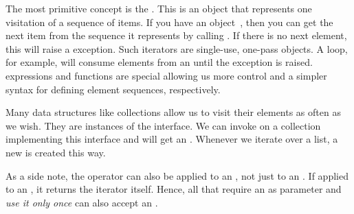 The most primitive concept is the .
This is an object that represents one visitation of a sequence of items.
If you have an  object~, then you can get the next item from the sequence it represents by calling .
If there is no next element, this will raise a  exception.
Such iterators are single-use, one-pass objects.
A  loop, for example, will consume elements from an  until the  exception is raised.
 expressions and functions are special  allowing us more control and a simpler syntax for defining element sequences, respectively.

Many data structures like collections allow us to visit their elements as often as we wish.
They are instances of the  interface.
We can invoke  on a collection  implementing this  interface and will get an .
Whenever we iterate over a list, a new  is created this way.

As a side note, the operator  can also be applied to an , not just to an .
If applied to an , it returns the iterator itself.
Hence, all  that require an  as parameter and \emph{use it only once} can also accept an .

